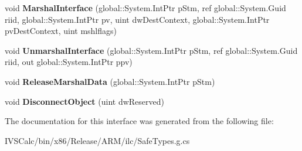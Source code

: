 \begin{DoxyCompactItemize}
\item 
\mbox{\label{interface_system_1_1_runtime_1_1_interop_services_1_1_i_marshal_____system___runtime___windows_runtime_a8598188070b1e46f9ba750c61433e126}} 
void {\bfseries Marshal\+Interface} (global\+::\+System.\+Int\+Ptr p\+Stm, ref global\+::\+System.\+Guid riid, global\+::\+System.\+Int\+Ptr pv, uint dw\+Dest\+Context, global\+::\+System.\+Int\+Ptr pv\+Dest\+Context, uint mshlflags)
\item 
\mbox{\label{interface_system_1_1_runtime_1_1_interop_services_1_1_i_marshal_____system___runtime___windows_runtime_a3e8bcee1d02a9ee6b7ef2e3996b54765}} 
void {\bfseries Unmarshal\+Interface} (global\+::\+System.\+Int\+Ptr p\+Stm, ref global\+::\+System.\+Guid riid, out global\+::\+System.\+Int\+Ptr ppv)
\item 
\mbox{\label{interface_system_1_1_runtime_1_1_interop_services_1_1_i_marshal_____system___runtime___windows_runtime_a3b9d876c6a7a35f23897b4e47568578c}} 
void {\bfseries Release\+Marshal\+Data} (global\+::\+System.\+Int\+Ptr p\+Stm)
\item 
\mbox{\label{interface_system_1_1_runtime_1_1_interop_services_1_1_i_marshal_____system___runtime___windows_runtime_a6c9ed45c61839a823eaeb6e035dd2e25}} 
void {\bfseries Disconnect\+Object} (uint dw\+Reserved)
\end{DoxyCompactItemize}


The documentation for this interface was generated from the following file\+:\begin{DoxyCompactItemize}
\item 
I\+V\+S\+Calc/bin/x86/\+Release/\+A\+R\+M/ilc/Safe\+Types.\+g.\+cs\end{DoxyCompactItemize}
